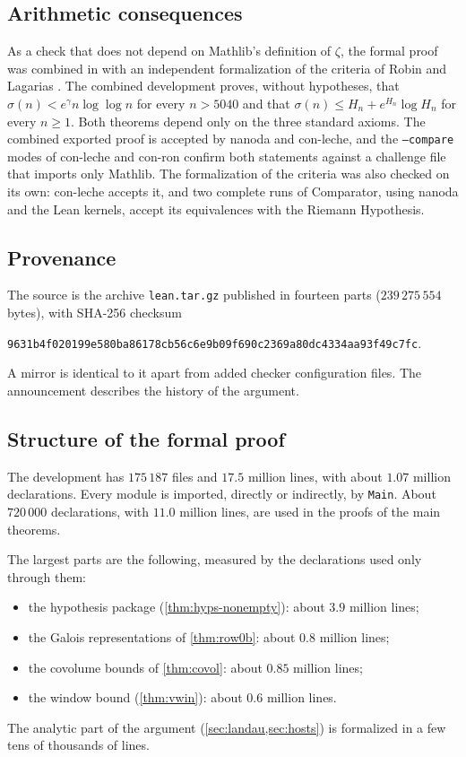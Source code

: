 \subsection{Arithmetic consequences}\label{sec:verification:arith}
As a check that does not depend on Mathlib's definition of $\zeta$, the formal proof was combined in
\cite{Sutherland2026} with an independent formalization \cite{Robin1984Lean} of the criteria of Robin
\cite{Robin1984} and Lagarias \cite{Lagarias2002}. The combined development proves, without hypotheses,
that $\sigma(n)<e^{\gamma}n\log\log n$ for every $n>5040$ and that $\sigma(n)\le H_n+e^{H_n}\log H_n$
for every $n\ge1$. Both theorems depend only on the three standard axioms. The combined exported proof
is accepted by nanoda and con-leche, and the \texttt{--compare} modes of con-leche and con-ron confirm
both statements against a challenge file that imports only Mathlib. The formalization
\cite{Robin1984Lean} of the criteria was also checked on its own: con-leche accepts it, and two complete
runs of Comparator, using nanoda and the Lean kernels, accept its equivalences with the Riemann
Hypothesis.

\subsection{Provenance}
The source is the archive \texttt{lean.tar.gz} published in fourteen parts \cite{LeanSource2026}
($239\,275\,554$ bytes), with SHA-256 checksum
\begin{center}\small\texttt{9631b4f020199e580ba86178cb56c6e9b09f690c2369a80dc4334aa93f49c7fc}.\end{center}
A mirror is identical to it apart from added checker configuration files. The announcement
\cite{Announcement2026} describes the history of the argument.

\subsection{Structure of the formal proof}
The development has $175\,187$ files and $17.5$ million lines, with about $1.07$ million declarations.
Every module is imported, directly or indirectly, by \texttt{Main}. About $720\,000$ declarations, with
$11.0$ million lines, are used in the proofs of the main theorems.

The largest parts are the following, measured by the declarations used only through them:
\begin{itemize}
\item the hypothesis package (\cref{thm:hyps-nonempty}): about $3.9$ million lines;
\item the Galois representations of \cref{thm:row0b}: about $0.8$ million lines;
\item the covolume bounds of \cref{thm:covol}: about $0.85$ million lines;
\item the window bound (\cref{thm:vwin}): about $0.6$ million lines.
\end{itemize}
The analytic part of the argument (\cref{sec:landau,sec:hosts}) is formalized in a few tens of thousands
of lines.
